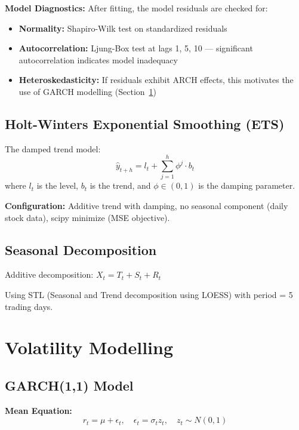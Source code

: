 \documentclass[12pt, a4paper, oneside]{report}
\begin{document}
\textbf{Model Diagnostics:}
After fitting, the model residuals are checked for:
\begin{itemize}[nosep]
    \item \textbf{Normality:} Shapiro-Wilk test on standardized residuals
    \item \textbf{Autocorrelation:} Ljung-Box test at lags 1, 5, 10 --- significant autocorrelation indicates model inadequacy
    \item \textbf{Heteroskedasticity:} If residuals exhibit ARCH effects, this motivates the use of GARCH modelling (Section~\ref{sec:meth_volatility})
\end{itemize}

\subsection{Holt-Winters Exponential Smoothing (ETS)}

The damped trend model:
\begin{equation}
    \hat{y}_{t+h} = l_t + \sum_{j=1}^{h} \phi^j \cdot b_t
\end{equation}
where $l_t$ is the level, $b_t$ is the trend, and $\phi \in (0,1)$ is the damping parameter.

\textbf{Configuration:} Additive trend with damping, no seasonal component (daily stock data), scipy minimize (MSE objective).

\subsection{Seasonal Decomposition}

Additive decomposition: $X_t = T_t + S_t + R_t$

Using STL (Seasonal and Trend decomposition using LOESS) with period = 5 trading days.

\section{Volatility Modelling}
\label{sec:meth_volatility}

\subsection{GARCH(1,1) Model}

\textbf{Mean Equation:}
\begin{equation}
    r_t = \mu + \epsilon_t, \quad \epsilon_t = \sigma_t z_t, \quad z_t \sim N(0,1)
\end{equation}
\end{document}

